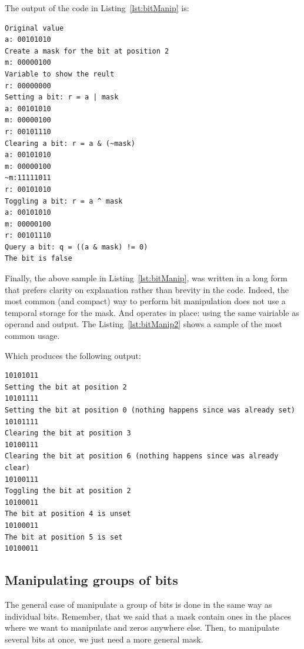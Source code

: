 The output of the code in Listing~\ref{lst:bitManip} is:
\begin{verbatim}
Original value
a: 00101010
Create a mask for the bit at position 2
m: 00000100
Variable to show the reult
r: 00000000
Setting a bit: r = a | mask
a: 00101010
m: 00000100
r: 00101110
Clearing a bit: r = a & (~mask)
a: 00101010
m: 00000100
~m:11111011
r: 00101010
Toggling a bit: r = a ^ mask
a: 00101010
m: 00000100
r: 00101110
Query a bit: q = ((a & mask) != 0)
The bit is false
\end{verbatim}

Finally, the above sample in Listing~\ref{lst:bitManip}, was written in a long form that prefers clarity on explanation rather than brevity in the code.
Indeed, the most common (and compact) way to perform bit manipulation does not use a temporal storage for the mask.
And operates in place: using the same vairiable as operand and output.
The Listing~\ref{lst:bitManip2} shows a sample of the most common usage.

{\centering
\begin{minipage}{\linewidth}
\end{minipage}
\par
}

Which produces the following output:
\begin{verbatim}
10101011
Setting the bit at position 2
10101111
Setting the bit at position 0 (nothing happens since was already set)
10101111
Clearing the bit at position 3
10100111
Clearing the bit at position 6 (nothing happens since was already clear)
10100111
Toggling the bit at position 2
10100011
The bit at position 4 is unset
10100011
The bit at position 5 is set
10100011  
\end{verbatim}

\subsection{Manipulating groups of bits}

The general case of manipulate a group of bits is done in the same way as individual bits.
Remember, that we said that a mask contain ones in the places where we want to manipulate and zeros anywhere else.
Then, to manipulate several bits at once, we just need a more general mask.

